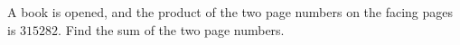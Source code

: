 A book is opened, and the product of the two page numbers on the facing pages is $315282$. Find the sum of the two page numbers.
